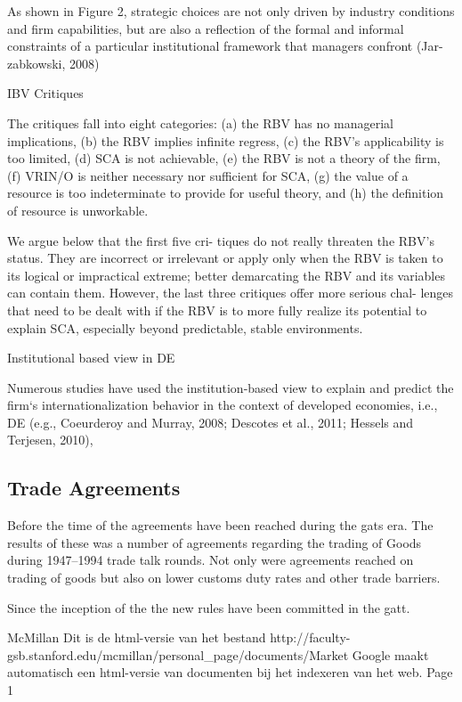 As shown in Figure 2, strategic choices are not only driven by industry conditions and firm capabilities, but are also a reflection of the formal and informal constraints of a particular institutional framework that managers confront (Jar- zabkowski, 2008)



IBV Critiques

The critiques fall into eight categories: 
(a) the RBV has no managerial implications, 
(b) the RBV implies infinite regress, 
(c) the RBV’s applicability is too limited, 
(d) SCA is not achievable, 
(e) the RBV is not a theory of the firm, 
(f) VRIN/O is neither necessary nor sufficient for SCA, 
(g) the value of a resource is too indeterminate to provide for useful theory, and 
(h) the definition of resource is unworkable.


 We argue below that the first five cri- tiques do not really threaten the RBV’s status. They are incorrect or irrelevant or apply only when the RBV is taken to its logical or impractical extreme; better demarcating the RBV and its variables can contain them. However, the last three critiques offer more serious chal- lenges that need to be dealt with if the RBV is to more fully realize its potential to explain SCA, especially beyond predictable, stable environments.
 


Institutional based view in DE

Numerous studies have used the institution-based view to explain and predict the firm‘s internationalization behavior in the context of developed economies, i.e., DE (e.g., Coeurderoy and Murray, 2008; Descotes et al., 2011; Hessels and Terjesen, 2010),

\subsection{Trade Agreements}
Before the time of the \wto agreements have been reached during the \gls{gats} era. The results of these was a number of agreements regarding the trading of Goods during 1947--1994 trade talk rounds. Not only were agreements reached on trading of goods but also on lower customs duty rates and other trade barriers.

Since the inception of the \wto the new rules have been committed in the \gls{gatt}. 







McMillan
Dit is de html-versie van het bestand http://faculty-gsb.stanford.edu/mcmillan/personal_page/documents/Market%
Google maakt automatisch een html-versie van documenten bij het indexeren van het web.
Page 1
